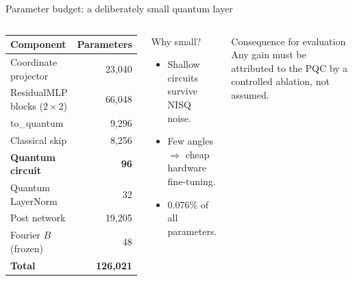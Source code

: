 \documentclass[aspectratio=169,10pt]{beamer}
\begin{document}
\begin{frame}{Parameter budget: a deliberately small quantum layer}
\begin{columns}[T,onlytextwidth]
\begin{center}
\small
\begin{tabular}{lr}
\toprule
Component & Parameters \\
\midrule
Coordinate projector & 23,040 \\
ResidualMLP blocks ($2\times2$) & 66,048 \\
to\_quantum & 9,296 \\
Classical skip & 8,256 \\
\textbf{Quantum circuit} & \textbf{96} \\
Quantum LayerNorm & 32 \\
Post network & 19,205 \\
Fourier $B$ (frozen) & 48 \\
\midrule
\textbf{Total} & \textbf{126,021} \\
\bottomrule
\end{tabular}
\end{center}
\begin{block}{Why small?}
\small
\begin{itemize}
  \item Shallow circuits survive NISQ noise.
  \item Few angles $\Rightarrow$ cheap hardware fine-tuning.
  \item 0.076\% of all parameters.
\end{itemize}
\end{block}
\begin{alertblock}{Consequence for evaluation}
\small Any gain must be attributed to the PQC by a controlled ablation, not assumed.
\end{alertblock}
\end{columns}
\end{frame}
\end{document}

